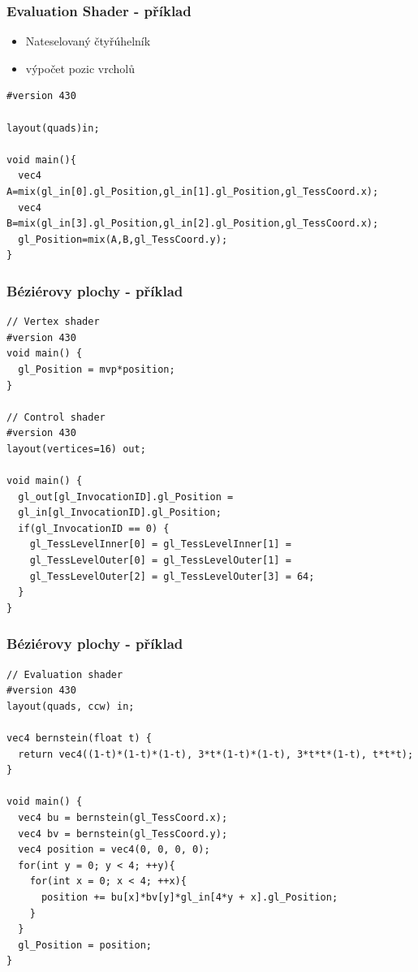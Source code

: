 \begin{frame}[fragile]
\frametitle{Evaluation Shader - příklad}
	\begin{itemize}
		\item Nateselovaný čtyřúhelník
		\item výpočet pozic vrcholů
	\end{itemize}
	{\scriptsize
	\begin{verbatim}
#version 430

layout(quads)in;

void main(){
  vec4 A=mix(gl_in[0].gl_Position,gl_in[1].gl_Position,gl_TessCoord.x);
  vec4 B=mix(gl_in[3].gl_Position,gl_in[2].gl_Position,gl_TessCoord.x);
  gl_Position=mix(A,B,gl_TessCoord.y);
}
	\end{verbatim}
	}
\end{frame}




\begin{frame}[fragile]
  \frametitle{Béziérovy plochy - příklad}
	{\scriptsize
	\begin{verbatim}
// Vertex shader	
#version 430
void main() {
  gl_Position = mvp*position;
}

// Control shader
#version 430
layout(vertices=16) out;

void main() {
  gl_out[gl_InvocationID].gl_Position =
  gl_in[gl_InvocationID].gl_Position;
  if(gl_InvocationID == 0) {
    gl_TessLevelInner[0] = gl_TessLevelInner[1] = 
    gl_TessLevelOuter[0] = gl_TessLevelOuter[1] =
    gl_TessLevelOuter[2] = gl_TessLevelOuter[3] = 64;
  }
}
	\end{verbatim}
	}
\end{frame}

\begin{frame}[fragile]
    \frametitle{Béziérovy plochy - příklad}
  	{\scriptsize
		\begin{verbatim}
// Evaluation shader
#version 430
layout(quads, ccw) in;

vec4 bernstein(float t) {
  return vec4((1-t)*(1-t)*(1-t), 3*t*(1-t)*(1-t), 3*t*t*(1-t), t*t*t);
}

void main() {
  vec4 bu = bernstein(gl_TessCoord.x);
  vec4 bv = bernstein(gl_TessCoord.y);
  vec4 position = vec4(0, 0, 0, 0);
  for(int y = 0; y < 4; ++y){
    for(int x = 0; x < 4; ++x){
      position += bu[x]*bv[y]*gl_in[4*y + x].gl_Position;
    }
  }
  gl_Position = position;
}
  	\end{verbatim}
		}
\end{frame}

